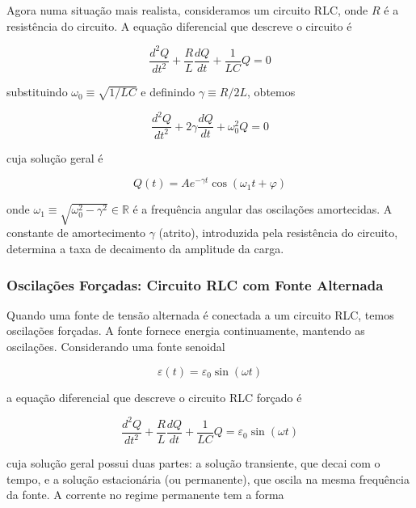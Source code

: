 \documentclass[12pt]{article}
\begin{document}
Agora numa situação mais realista, consideramos um circuito RLC, onde \(R\) é a resistência do circuito. A equação diferencial que descreve o circuito é

\begin{equation}
    \frac{d^2Q}{dt^2} + \frac{R}{L} \frac{dQ}{dt} + \frac{1}{LC} Q = 0
\end{equation}

\noindent substituindo \(\omega_0 \equiv \sqrt{1/LC}\) e definindo \(\gamma \equiv R/2L\), obtemos

\begin{equation}
    \frac{d^2Q}{dt^2} + 2\gamma \frac{dQ}{dt} + \omega_0^2 Q = 0
\end{equation}

\noindent cuja solução geral é

\begin{equation}\label{eq:solucao_oscilador_amortecido}
    \boxed{Q(t) = A e^{-\gamma t} \cos(\omega_1 t + \varphi)}
\end{equation}

\noindent onde \(\displaystyle \omega_1 \equiv \sqrt{\omega_0^2 - \gamma^2}\in\mathbb{R}\) é a frequência angular das oscilações amortecidas. A constante de amortecimento \(\gamma\) (atrito), introduzida pela resistência do circuito, determina a taxa de decaimento da amplitude da carga.

\subsubsection{Oscilações Forçadas: Circuito RLC com Fonte Alternada}

Quando uma fonte de tensão alternada é conectada a um circuito RLC, temos oscilações forçadas. A fonte fornece energia continuamente, mantendo as oscilações. Considerando uma fonte senoidal

\begin{equation}
    \varepsilon(t) = \varepsilon_0 \sin(\omega t)
\end{equation}

\noindent a equação diferencial que descreve o circuito RLC forçado é

\begin{equation}
    \frac{d^2Q}{dt^2} + \frac{R}{L} \frac{dQ}{dt} + \frac{1}{LC} Q = \varepsilon_0 \sin(\omega t)
\end{equation}

\noindent cuja solução geral possui duas partes: a solução transiente, que decai com o tempo, e a solução estacionária (ou permanente), que oscila na mesma frequência da fonte. A corrente no regime permanente tem a forma
\end{document}
